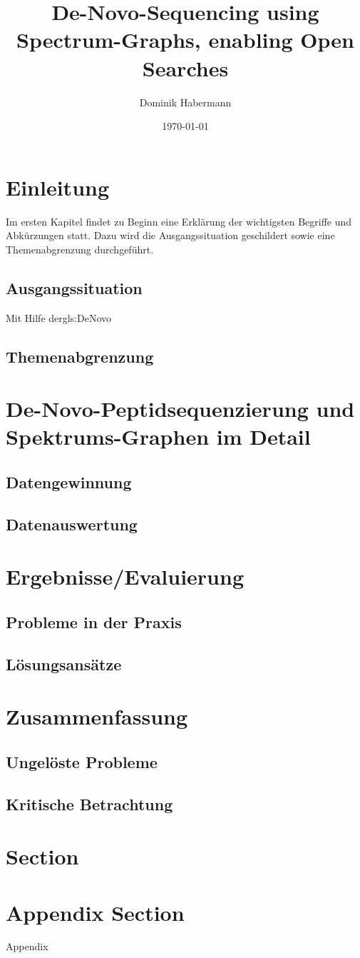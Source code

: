 \documentclass[a4paper, 12pt]{article}
\title{De-Novo-Sequencing using Spectrum-Graphs, enabling Open Searches}
\author{Dominik Habermann}
\date{\today}
\begin{document}
\maketitle

\section{Einleitung}
Im ersten Kapitel findet zu Beginn eine Erklärung der wichtigsten Begriffe und Abkürzungen statt. Dazu wird die Ausgangssituation geschildert sowie eine Themenabgrenzung durchgeführt.

\printnoidxglossaries

\subsection{Ausgangssituation}
Mit Hilfe der\gls{gls:DeNovo} 
\subsection{Themenabgrenzung}




\section{De-Novo-Peptidsequenzierung und Spektrums-Graphen im Detail}
\subsection{Datengewinnung}
\subsection{Datenauswertung}
 

\section{Ergebnisse/Evaluierung}
\subsection{Probleme in der Praxis}
\subsection{Lösungsansätze}


\section{Zusammenfassung}
\subsection{Ungelöste Probleme}
\subsection{Kritische Betrachtung}


\section{Section}
\cite{OpenPNovo}
\cite{pNovoPlus}

\begingroup
\setlength{\emergencystretch}{.5em}
\printbibliography
\endgroup

\appendix
\section{Appendix Section}
Appendix
\end{document}
